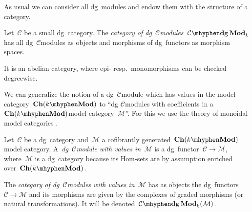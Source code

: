 As usual we can consider all dg~modules and endow them with the structure of a category.
\begin{definition}
  \label{definition:category-of-dg-modules}
  Let~$\mathcal{C}$ be a small dg~category. The \emph{category of dg~$\mathcal{C}$\dash modules}~$\dgMod{\mathcal{C}}_k$ has all dg~$\mathcal{C}$\dash modules as objects and morphisms of dg~functors as morphism spaces. 
\end{definition}
It is an abelian category, where epi- resp.\ monomorphisms can be checked degreewise.

We can generalize the notion of a dg~$\mathcal{C}$\dash module which has values in the model category~$\Ch(k\mhyphen\Mod)$ to ``dg $\mathcal{C}$\dash modules with coefficients in a~$\Ch(k\mhyphen\Mod)$\dash model category~$\mathcal{M}$''. For this we use the theory of monoidal model categories \cite[section 4.2]{hovey}.
\begin{definition}
  \label{definition:C-dgMod(M)}
  Let~$\mathcal{C}$ be a dg~category and~$\mathcal{M}$ a cofibrantly generated~$\Ch(k\mhyphen\Mod)$\dash model category. A~\emph{dg~$\mathcal{C}$\dash module with values in~$\mathcal{M}$} is a dg~functor~$\mathcal{C}\to\mathcal{M}$, where~$\mathcal{M}$ is a dg~category because its Hom-sets are by assumption enriched over~$\Ch(k\mhyphen\Mod)$.
  
  The \emph{category of dg~$\mathcal{C}$\dash modules with values in~$\mathcal{M}$} has as objects the dg~functors~$\mathcal{C}\to\mathcal{M}$ and its morphisms are given by the complexes of graded morphisms (or natural transformations). It will be denoted~$\dgMod{\mathcal{C}}_k(\mathcal{M})$.
\end{definition}

